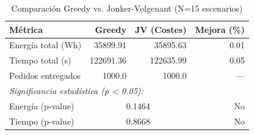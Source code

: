 \begin{table}[htbp]
\centering
\caption{Comparación Greedy vs. Jonker-Volgenant (N=15 escenarios)}
\label{tab:comparison}
\begin{tabular}{lrrr}
\hline
\textbf{Métrica} & \textbf{Greedy} & \textbf{JV (Costes)} & \textbf{Mejora (\%)} \\
\hline
Energía total (Wh) & 35899.91 & 35895.63 & 0.01 \\
Tiempo total (s) & 122691.36 & 122635.99 & 0.05 \\
Pedidos entregados & 1000.0 & 1000.0 & — \\
\hline
\multicolumn{4}{l}{\textit{Significancia estadística (p < 0.05):}} \\
Energía (p-value) & \multicolumn{2}{c}{0.1464} & No \\
Tiempo (p-value) & \multicolumn{2}{c}{0.8668} & No \\
\hline
\end{tabular}
\end{table}